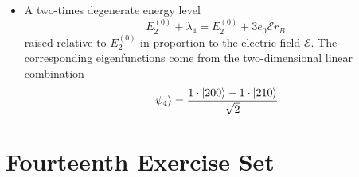 \documentclass[11pt, a4paper]{article}
\newcommand{\p}{\psi}  %
\newcommand{\E}{\mathcal{E}}  %
\begin{document}
\begin{itemize}
\begin{itemize}
		\item A two-times degenerate energy level
		\begin{equation*}
			E^{(0)}_{2} + \lambda_{4} = E^{(0)}_{2} + 3 e_{0}\E r_{B}
		\end{equation*}
		raised relative to $ E^{(0)}_{2} $ in proportion to the electric field $ \E $. The corresponding eigenfunctions come from the two-dimensional linear combination
		\begin{equation*}
			\ket{\p_{4}} = \frac{1\cdot \ket{200} - 1\cdot \ket{210}}{\sqrt{2}}
		\end{equation*}
		
	\end{itemize}
	
\end{itemize}

\section{Fourteenth Exercise Set}
\end{document}
